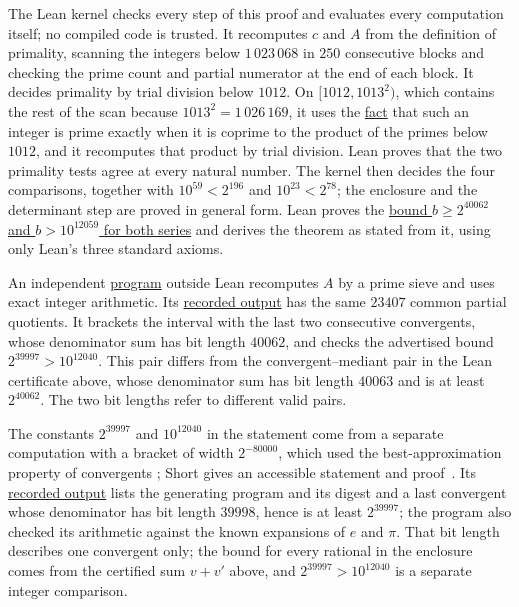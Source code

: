 \documentclass[11pt]{article}
\begin{document}
The Lean kernel checks every step of this proof and evaluates every
computation itself; no compiled code is trusted.  It recomputes $c$ and
$A$ from the definition of primality, scanning the integers below
$1\,023\,068$ in $250$ consecutive blocks and checking the prime count and
partial numerator at the end of each block.  It decides primality by trial
division below $1012$.  On $[1012,1013^2)$, which contains the rest of the
scan because $1013^2=1\,026\,169$, it uses the
\href{https://github.com/wcook04/plectis-erdos/blob/e6c2d8f77ac24753c5216a49f4daf7f7388b309f/verification/Erdos251LargeCertificate/ErdosProblems/Erdos251/GcdPrimality.lean\#L72}{fact}
that such an integer is prime exactly when it is coprime to the product of the
primes below $1012$, and it recomputes that product by trial division.  Lean
proves that the two primality tests agree at every natural number.  The kernel
then decides the four comparisons, together with $10^{59}<2^{196}$ and
$10^{23}<2^{78}$; the enclosure and the determinant step are proved in
general form.  Lean proves the
\href{https://github.com/wcook04/plectis-erdos/blob/e6c2d8f77ac24753c5216a49f4daf7f7388b309f/verification/Erdos251LargeCertificate/ErdosProblems/Erdos251/PaperLargeStreamingV5.lean\#L76}{bound $b\ge2^{40062}$ and $b>10^{12059}$ for both series}
and derives the theorem as stated from it, using only Lean's three
standard axioms.

An independent
\href{https://github.com/wcook04/plectis-erdos/blob/beaf0866976c908539fba0a96075374dd658f44a/research/experiments/erdos251/exact_replay.py}{program}
outside Lean recomputes $A$ by a prime sieve and uses exact integer
arithmetic.  Its \href{https://github.com/wcook04/plectis-erdos/blob/beaf0866976c908539fba0a96075374dd658f44a/research/experiments/erdos251/receipts/251-exact-replay.json}{recorded output}
has the same $23407$ common partial quotients.  It brackets the interval
with the last two consecutive convergents, whose denominator sum has
bit length $40062$, and checks the advertised bound $2^{39997}>10^{12040}$.
This pair differs from the convergent--mediant pair in the Lean certificate
above, whose denominator sum has bit length $40063$ and is at least
$2^{40062}$.  The two bit lengths refer to different valid pairs.

The constants $2^{39997}$ and $10^{12040}$ in the statement come from a
separate computation with a bracket of width $2^{-80000}$, which used the best-approximation property of
convergents \cite[\S6, Theorems~16 and~17]{khinchin1964}; Short gives an
accessible statement and proof~\cite[Theorem~1.1]{short2009}.  Its
\href{https://github.com/wcook04/plectis-erdos/blob/dd6cc708f650f061de06594eba6ba43878f4de31/research/experiments/erdos251/receipts/certified-cf.json}{recorded output}
lists the generating program and its digest and a last convergent whose
denominator has bit length $39998$, hence is at least $2^{39997}$; the
program also checked its arithmetic against the known expansions of $e$
and $\pi$.  That bit length describes one convergent only; the bound for
every rational in the enclosure comes from the certified sum $v+v'$
above, and $2^{39997}>10^{12040}$ is a separate integer comparison.
\end{document}
